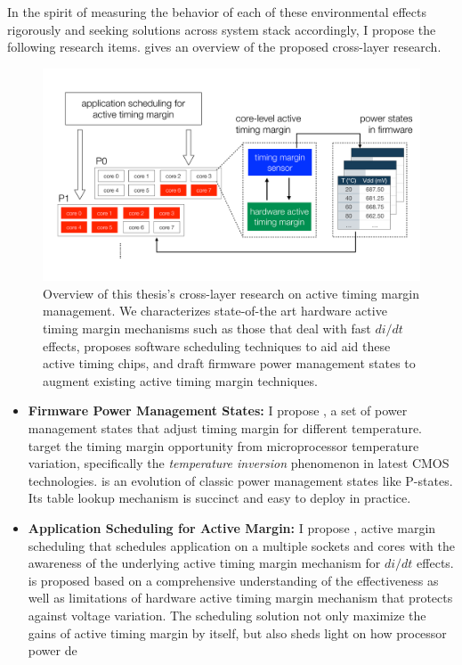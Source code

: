 In the spirit of measuring the behavior of each of these environmental effects rigorously and seeking solutions across system stack accordingly, I propose the following research items.  gives an overview of the proposed cross-layer research.

\begin{figure}
  \centering
  \includegraphics[trim=0 0 0 0, clip, width=\columnwidth]{graphs/intro/sys-overview.pdf}
  \caption{Overview of this thesis's cross-layer research on active timing margin management. We characterizes state-of-the art hardware active timing margin mechanisms such as those that deal with fast $di/dt$ effects, proposes software scheduling techniques to aid aid these active timing chips, and draft firmware power management states to augment existing active timing margin techniques.}
  \label{fig:framework}
\end{figure}

\begin{itemize}
\item \textbf{Firmware Power Management States:} I propose \tistate, a set of power management states that adjust timing margin for different temperature. \tistates target the timing margin opportunity from microprocessor temperature variation, specifically the \textit{temperature inversion} phenomenon in latest CMOS technologies. \tistate is an evolution of classic power management states like P-states. Its table lookup mechanism is succinct and easy to deploy in practice.

\item \textbf{Application Scheduling for Active Margin:} I propose \ams, active margin scheduling that schedules application on a multiple sockets and cores with the awareness of the underlying active timing margin mechanism for $di/dt$ effects. \ams is proposed based on a comprehensive understanding of the effectiveness as well as limitations of hardware active timing margin mechanism that protects against voltage variation. The scheduling solution not only maximize the gains of active timing margin by itself, but also sheds light on how processor power de
\end{itemize}

